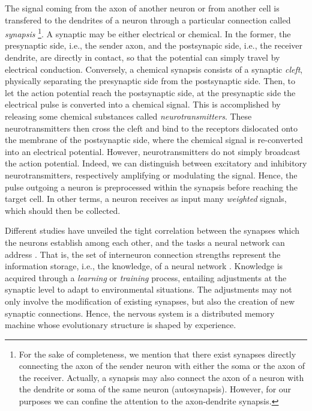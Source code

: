 \documentclass[12pt, a4paper, twoside, openright, notitlepage]{report}
\numberwithin{equation}{chapter}
\theoremstyle{theorem}
\theoremstyle{definition}
\theoremstyle{remark}
\theoremstyle{proposition}
\numberwithin{figure}{chapter}
\begin{document}
		The signal coming from the axon of another neuron or from another cell is transfered to the dendrites of a neuron through a particular connection called \emph{synapsis} \footnote{For the sake of completeness, we mention that there exist synapses directly connecting the axon of the sender neuron with either the soma or the axon of the receiver. Actually, a synapsis may also connect the axon of a neuron with the dendrite or soma of the same neuron (autosynapsis). However, for our purposes we can confine the attention to the axon-dendrite synapsis.}. A synaptic may be either electrical or chemical. In the former, the presynaptic side, i.e., the sender axon, and the postsynapic side, i.e., the receiver dendrite, are directly in contact, so that the potential can simply travel by electrical conduction. Conversely, a chemical synapsis consists of a synaptic \emph{cleft}, physically separating the presynaptic side from the postsynaptic side. Then, to let the action potential reach the postsynaptic side, at the presynaptic side the electrical pulse is converted into a chemical signal. This is accomplished by releasing some chemical substances called \emph{neurotransmitters}. These neurotransmitters then cross the cleft and bind to the receptors dislocated onto the membrane of the postsynaptic side, where the chemical signal is re-converted into an electrical potential. However, neurotransmitters do not simply broadcast the action potential. Indeed, we can distinguish between excitatory and inhibitory neurotransmitters, respectively amplifying or modulating the signal. Hence, the pulse outgoing a neuron is preprocessed within the synapsis before reaching the target cell. In other terms, a neuron receives as input many \emph{weighted} signals, which should then be collected.
		
		 Different studies have unveiled the tight correlation between the synapses which the neurons establish among each other, and the tasks a neural network can address \cite{Hag14}. That is, the set of interneuron connection strengths represent the information storage, i.e., the knowledge, of a neural network \cite{Kri07}. Knowledge is acquired through a \emph{learning} or \emph{training} process, entailing adjustments at the synaptic level to adapt to environmental situations. The adjustments may not only involve the modification of existing synapses, but also the creation of new synaptic connections. Hence, the nervous system is a distributed memory machine whose evolutionary structure is shaped by experience.
		 
\end{document}
